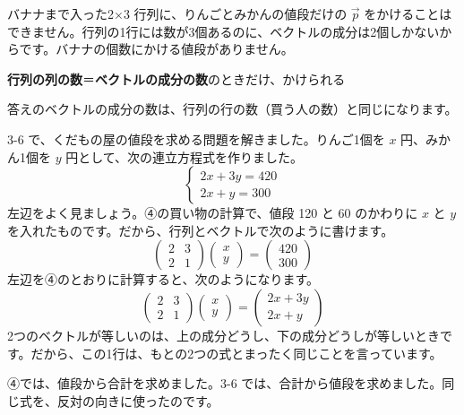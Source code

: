 バナナまで入った2×3 行列に、りんごとみかんの値段だけの $\vec p$ をかけることはできません。行列の1行には数が3個あるのに、ベクトルの成分は2個しかないからです。バナナの個数にかける値段がありません。

\begin{center}
\textbf{行列の列の数}\enspace ＝\enspace \textbf{ベクトルの成分の数}\enspace のときだけ、かけられる
\end{center}

答えのベクトルの成分の数は、行列の行の数（買う人の数）と同じになります。



\label{bk:7-1:renritsu}3-6 で、くだもの屋の値段を求める問題を解きました。りんご1個を $x$ 円、みかん1個を $y$ 円として、次の連立方程式を作りました。
\[ \begin{cases} 2x+3y=420\\ 2x+y=300 \end{cases} \]
左辺をよく見ましょう。④の買い物の計算で、値段 120 と 60 のかわりに $x$ と $y$ を入れたものです。だから、行列とベクトルで次のように書けます。
\[ \begin{pmatrix} 2 & 3\\ 2 & 1 \end{pmatrix}\begin{pmatrix} x\\ y \end{pmatrix}=\begin{pmatrix} 420\\ 300 \end{pmatrix} \]
左辺を④のとおりに計算すると、次のようになります。
\[ \begin{pmatrix} 2 & 3\\ 2 & 1 \end{pmatrix}\begin{pmatrix} x\\ y \end{pmatrix}=\begin{pmatrix} 2x+3y\\ 2x+y \end{pmatrix} \]
2つのベクトルが等しいのは、上の成分どうし、下の成分どうしが等しいときです。だから、この1行は、もとの2つの式とまったく同じことを言っています。

④では、値段から合計を求めました。3-6 では、合計から値段を求めました。同じ式を、反対の向きに使ったのです。

